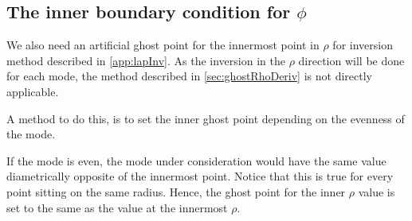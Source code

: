 \subsection{The inner boundary condition for \texorpdfstring{$\phi$}{the potential}}
\label{sec:innerPhiBC}
%
We also need an artificial ghost point for the innermost point in $\rho$ for inversion method described in \cref{app:lapInv}.
As the inversion in the $\rho$ direction will be done for each mode, the method described in \cref{sec:ghostRhoDeriv} is not directly applicable.

A method to do this, is to set the inner ghost point depending on the evenness of the mode.

If the mode is even, the mode under consideration would have the same value diametrically opposite of the innermost point.
Notice that this is true for every point sitting on the same radius.
Hence, the ghost point for the inner $\rho$ value is set to the same as the value at the innermost $\rho$.

